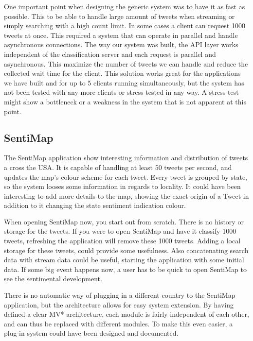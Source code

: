 One important point when designing the generic system was to have it as fast as possible. This to be able to handle large amount of tweets when streaming or simply searching with a high count limit. In some cases a client can request 1000 tweets at once. This required a system that can operate in parallel and handle asynchronous connections. The way our system was built, the API layer works independent of the classification server and each request is parallel and asynchronous. This maximize the number of tweets we can handle and reduce the collected wait time for the client. This solution works great for the applications we have built and for up to 5 clients running simultaneously, but the system has not been tested with any more clients or stress-tested in any way. A stress-test might show a bottleneck or a weakness in the system that is not apparent at this point. 

\subsection{SentiMap}

The SentiMap application show interesting information and distribution of tweets a cross the USA. It is capable of handling at least 50 tweets per second, and updates the map's colour scheme for each tweet. Every tweet is grouped by state, so the system looses some information in regards to locality. It could have been interesting to add more details to the map, showing the exact origin of a Tweet in addition to it changing the state sentiment indication colour.

When opening SentiMap now, you start out from scratch. There is no history or storage for the tweets. If you were to open SentiMap and have it classify 1000 tweets, refreshing the application will remove these 1000 tweets. Adding a local storage for these tweets, could provide some usefulness. Also concatenating search data with stream data could be useful, starting the application with some initial data. If some big event happens now, a user has to be quick to open SentiMap to see the sentimental development. 

There is no automatic way of plugging in a different country to the SentiMap application, but the architecture allows for easy system extension. By having defined a clear MV* architecture, each module is fairly independent of each other, and can thus be replaced with different modules. To make this even easier, a plug-in system could have been designed and documented. 

